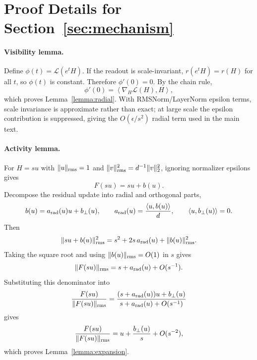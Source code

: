 \section{Proof Details for Section~\ref{sec:mechanism}}
\label{app:proofs}

\paragraph{Visibility lemma.}
Define $\phi(t)=\mathcal{L}(e^tH)$.
If the readout is scale-invariant, $r(e^tH)=r(H)$ for all $t$, so $\phi(t)$ is constant.
Therefore $\phi'(0)=0$.
By the chain rule,
\begin{equation}
    \phi'(0)=\left\langle \nabla_H \mathcal{L}(H), H\right\rangle,
\end{equation}
which proves Lemma~\ref{lemma:radial}.
With RMSNorm/LayerNorm epsilon terms, scale invariance is approximate rather than exact; at large scale the epsilon contribution is suppressed, giving the $O(\epsilon/s^2)$ radial term used in the main text.

\paragraph{Activity lemma.}
For $H=su$ with $\|u\|_{\mathrm{rms}}=1$ and $\|v\|_{\mathrm{rms}}^2=d^{-1}\|v\|_2^2$, ignoring normalizer epsilons gives
\begin{equation}
    F(su)=su+b(u).
\end{equation}
Decompose the residual update into radial and orthogonal parts,
\begin{equation}
    b(u)=a_{\mathrm{rad}}(u)u+b_\perp(u),
    \qquad
    a_{\mathrm{rad}}(u)=\frac{\langle u,b(u)\rangle}{d},
    \qquad
    \langle u,b_\perp(u)\rangle=0 .
\end{equation}
Then
\begin{equation}
    \|su+b(u)\|_{\mathrm{rms}}^2
    =s^2+2s\,a_{\mathrm{rad}}(u)+\|b(u)\|_{\mathrm{rms}}^2 .
\end{equation}
Taking the square root and using $\|b(u)\|_{\mathrm{rms}}=O(1)$ in $s$ gives
\begin{equation}
    \|F(su)\|_{\mathrm{rms}}=s+a_{\mathrm{rad}}(u)+O(s^{-1}).
\end{equation}
Substituting this denominator into
\begin{equation}
    \frac{F(su)}{\|F(su)\|_{\mathrm{rms}}}
    =
    \frac{(s+a_{\mathrm{rad}}(u))u+b_\perp(u)}
         {s+a_{\mathrm{rad}}(u)+O(s^{-1})}
\end{equation}
gives
\begin{equation}
    \frac{F(su)}{\|F(su)\|_{\mathrm{rms}}}
    =
    u+\frac{b_\perp(u)}{s}+O(s^{-2}),
\end{equation}
which proves Lemma~\ref{lemma:expansion}.
